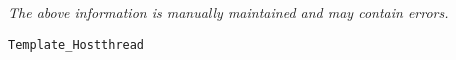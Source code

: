 \label{pkg:template\_hostthread}

{\tiny \it The above information is manually maintained and may contain errors.}
\begin{verbatim}
Template_Hostthread
\end{verbatim}
